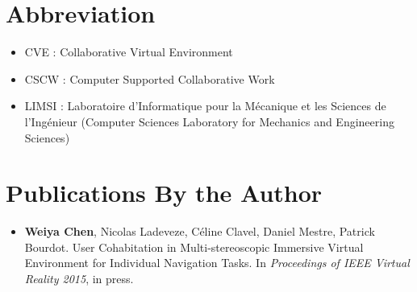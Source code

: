 \begin{appendices}
\appendixpage
\noappendicestocpagenum
\addappheadtotoc

\chapter{Abbreviation}
\label{appendix:abbreviation}
\begin{multicols}{2}
\begin{itemize}
\item CVE : Collaborative Virtual Environment
\item CSCW : Computer Supported Collaborative Work
\item LIMSI : Laboratoire d'Informatique pour la M\'ecanique et les Sciences de l'Ing\'enieur (Computer Sciences Laboratory for Mechanics and Engineering Sciences)
\end{itemize}
\end{multicols}


\chapter{Publications By the Author}

\begin{itemize}
\item \textbf{Weiya Chen}, Nicolas Ladeveze, C\'eline Clavel, Daniel Mestre, Patrick Bourdot. User Cohabitation in Multi-stereoscopic Immersive Virtual Environment for Individual Navigation Tasks. In \emph{Proceedings of IEEE Virtual Reality 2015}, in press.
\end{itemize}

\end{appendices}